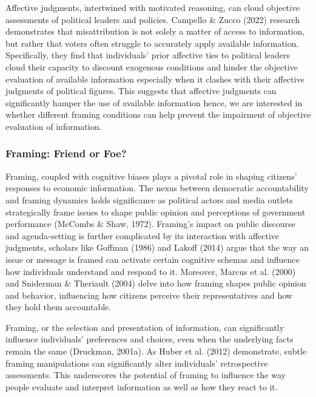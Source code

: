 \documentclass[
]{article}
\begin{document}
Affective judgments, intertwined with motivated reasoning, can cloud
objective assessments of political leaders and policies. Campello \&
Zucco (2022) research demonstrates that misattribution is not solely a
matter of access to information, but rather that voters often struggle
to accurately apply available information. Specifically, they find that
individuals' prior affective ties to political leaders cloud their
capacity to discount exogenous conditions and hinder the objective
evaluation of available information especially when it clashes with
their affective judgments of political figures. This suggests that
affective judgments can significantly hamper the use of available
information hence, we are interested in whether different framing
conditions can help prevent the impairment of objective evaluation of
information.

\hypertarget{framing-friend-or-foe}{%
\subsubsection{Framing: Friend or Foe?}\label{framing-friend-or-foe}}

Framing, coupled with cognitive biases plays a pivotal role in shaping
citizens' responses to economic information. The nexus between
democratic accountability and framing dynamics holds significance as
political actors and media outlets strategically frame issues to shape
public opinion and perceptions of government performance (McCombs \&
Shaw, 1972). Framing's impact on public discourse and agenda-setting is
further complicated by its interaction with affective judgments,
scholars like Goffman (1986) and Lakoff (2014) argue that the way an
issue or message is framed can activate certain cognitive schemas and
influence how individuals understand and respond to it. Moreover, Marcus
et al. (2000) and Sniderman \& Theriault (2004) delve into how framing
shapes public opinion and behavior, influencing how citizens perceive
their representatives and how they hold them accountable.

Framing, or the selection and presentation of information, can
significantly influence individuals' preferences and choices, even when
the underlying facts remain the same (Druckman, 2001a). As Huber et al.
(2012) demonstrate, subtle framing manipulations can significantly alter
individuals' retrospective assessments. This underscores the potential
of framing to influence the way people evaluate and interpret
information as well as how they react to it.
\end{document}
